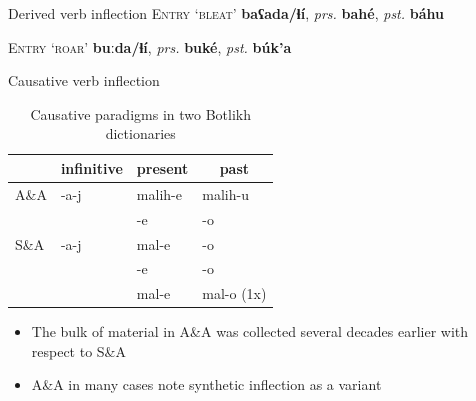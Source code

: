 \begin{frame}{Derived verb inflection}
\textsc{Entry `bleat'} \textbf{baʕada/ɬí}, \textit{prs.} \textbf{bahé}, \textit{pst.} \textbf{báhu} \citep{alekseev2019}


\pause
\vfill

\textsc{Entry `roar'} \textbf{buːda/ɬí}, \textit{prs.} \textbf{buké}, \textit{pst.} \textbf{búk'a} \citep{saidovaabusov2012}

\end{frame}

\begin{frame}{Causative verb inflection}

\begin{table}[h]
\caption{Causative paradigms in two Botlikh dictionaries}
\label{tab:caus}
\begin{tabular}{l|l|l|l}
     & \multicolumn{1}{c|}{infinitive} & \multicolumn{1}{c|}{present} & \multicolumn{1}{c}{past} \\ \hline
A\&A & -a-j                            & malih-e                      & malih-u                  \\
     &                                 & -e                           & -o                       \\ \hline
S\&A & -a-j                            & mal-e                        & -o                       \\
     &                                 & -e                           & -o                       \\
     &                                 & mal-e                        & mal-o (1x)                  
\end{tabular}
\end{table}

\pause

\begin{itemize}
    \item The bulk of material in A\&A was collected several decades earlier with respect to S\&A
    \item A\&A in many cases note synthetic inflection as a variant
\end{itemize}
\end{frame}


